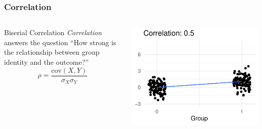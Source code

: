 \documentclass[12pt, block=fill]{beamer}
\newcommand{\cov}{\text{cov}}
\begin{document}
\begin{frame}
  \frametitle{Correlation}
  \begin{columns}
    \begin{block}{Biserial Correlation}
      \textit{Correlation} answers the question ``How strong
      is the relationship between group identity and the outcome?''
      \[
        \rho = \frac{\cov(X, Y)}{\sigma_{X}\sigma_{Y}}
      \]
    \end{block}
  \begin{center}
    \includegraphics[width = 0.9\linewidth]{./figures/biserial_05}
  \end{center}
  \end{columns}
\end{frame}
\end{document}
